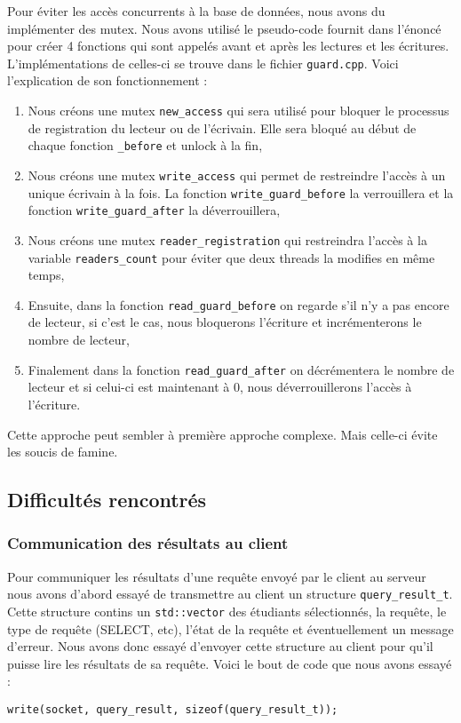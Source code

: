 \documentclass[utf8]{article}
\begin{document}
Pour éviter les accès concurrents à la base de données, nous avons du implémenter des mutex. Nous avons utilisé le pseudo-code fournit dans l'énoncé pour créer 4 fonctions qui sont appelés avant et après les lectures et les écritures. L'implémentations de celles-ci se trouve dans le fichier \texttt{guard.cpp}. Voici l'explication de son fonctionnement :
\begin{enumerate}
	\item Nous créons une mutex \texttt{new\_access} qui sera utilisé pour bloquer le processus de registration du lecteur ou de l'écrivain. Elle sera bloqué au début de chaque fonction \texttt{\_before} et unlock à la fin,
	\item Nous créons une mutex \texttt{write\_access} qui permet de restreindre l'accès à un unique écrivain à la fois. La fonction \texttt{write\_guard\_before} la verrouillera et la fonction \texttt{write\_guard\_after} la déverrouillera,
	\item Nous créons une mutex \texttt{reader\_registration} qui restreindra l'accès à la variable \texttt{readers\_count} pour éviter que deux threads la modifies en même temps,
	\item Ensuite, dans la fonction \texttt{read\_guard\_before} on regarde s'il n'y a pas encore de lecteur, si c'est le cas, nous bloquerons l'écriture et incrémenterons le nombre de lecteur,
	\item Finalement dans la fonction \texttt{read\_guard\_after} on décrémentera le nombre de lecteur et si celui-ci est maintenant à 0, nous déverrouillerons l'accès à l'écriture.
\end{enumerate}

Cette approche peut sembler à première approche complexe. Mais celle-ci évite les soucis de famine.

\subsection{Difficultés rencontrés}

\subsubsection{Communication des résultats au client}

Pour communiquer les résultats d'une requête envoyé par le client au serveur nous avons d'abord essayé de transmettre au client un structure \texttt{query\_result\_t}. Cette structure contins un \texttt{std::vector} des étudiants sélectionnés, la requête, le type de requête (SELECT, etc), l'état de la requête et éventuellement un message d'erreur. Nous avons donc essayé d'envoyer cette structure au client pour qu'il puisse lire les résultats de sa requête. Voici le bout de code que nous avons essayé :
\begin{lstlisting}
write(socket, query_result, sizeof(query_result_t));
\end{lstlisting}
	
\end{document}
